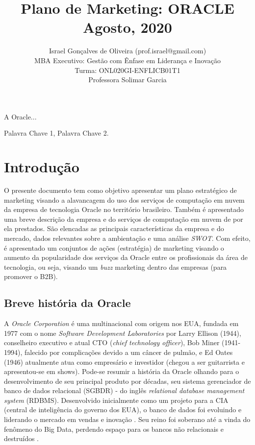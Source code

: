 \documentclass[a4paper]{article}
\title{Plano de Marketing: ORACLE \\
Agosto, 2020
}
\author{
    Israel Gonçalves de Oliveira (prof.israel@gmail.com) \\
    MBA Executivo: Gestão com Ênfase em Liderança e Inovação \\
    Turma: ONL020GI-ENFLICB01T1 \\
    Professora Solimar Garcia}
\begin{document}
 

\maketitle

\begin{resumo} 
A Oracle...
\end{resumo}

\begin{palavas-chave}
    Palavra Chave 1, Palavra Chave 2.
\end{palavas-chave}

\section{Introdução}

O presente documento tem como objetivo apresentar um plano estratégico de marketing visando a alavancagem do uso dos serviços de computação em nuvem da empresa de tecnologia Oracle no território brasileiro. Também é apresentado uma breve descrição da empresa e do serviços de computação em nuvem de  por ela prestados. São elencadas as principais características da empresa e do mercado, dados relevantes sobre a ambientação e uma análise \emph{SWOT}. Com efeito, é apresentado um conjuntos de ações (estratégia) de marketing visando o aumento da popularidade dos serviços da Oracle entre os profissionais da área de tecnologia, ou seja, visando um \emph{buzz} marketing dentro das empresas (para promover o B2B).

\subsection{Breve história da Oracle}
A \emph{Oracle Corporation} é uma multinacional com origem nos EUA, fundada em 1977 com o nome \emph{Software Development Laboratories} por Larry Ellison (1944), conselheiro executivo e atual CTO (\emph{chief technology officer}), Bob Miner (1941-1994), falecido por complicações devido a um câncer de pulmão, e Ed Oates (1946) atualmente atua como empresário e investidor (chegou a ser guitarrista e apresentou-se em shows). Pode-se resumir a história da Oracle olhando para o desenvolvimento de seu principal produto por décadas, seu sistema gerenciador de banco de dados relacional (SGBDR) - do inglês \emph{relational database management system} (RDBMS). Desenvolvido inicialmente como um projeto para a CIA (central de inteligência do governo dos EUA), o banco de dados foi evoluindo e liderando o mercado em vendas e inovação \cite{OracleCo5:online}. Seu reino foi soberano até a vinda do fenômeno do Big Data, perdendo espaço para os bancos não relacionais e destruídos \cite{NoSQLWi86:online}.
\end{document}
